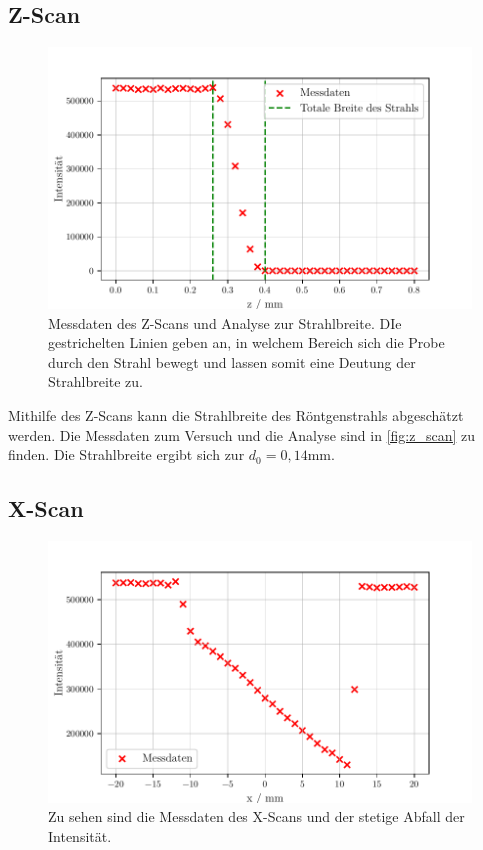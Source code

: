 \subsection{Z-Scan}

\begin{figure}
    \centering
    \includegraphics[width = 0.65 \linewidth]{build/z_scan.pdf}
    \caption{Messdaten des Z-Scans und Analyse zur Strahlbreite.
    DIe gestrichelten Linien geben an, in welchem Bereich sich die Probe durch den Strahl bewegt und
    lassen somit eine Deutung der Strahlbreite zu. }
    \label{fig:z_scan}
\end{figure}

Mithilfe des Z-Scans kann die Strahlbreite des Röntgenstrahls abgeschätzt werden.
Die Messdaten zum Versuch und die Analyse sind in \autoref{fig:z_scan} zu finden.
Die Strahlbreite ergibt sich zur $d_0 = 0{,}14 \unit{\milli\meter}$.

\subsection{X-Scan}

\begin{figure}
    \centering
    \includegraphics[width = 0.65 \linewidth]{build/x_scan.pdf}
    \caption{Zu sehen sind die Messdaten des X-Scans und der stetige Abfall der Intensität.}
    \label{fig:x_scan}
\end{figure}

